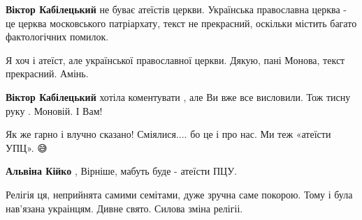 \begin{itemize}
\begin{itemize}
\textbf{Віктор Кабілецький} не буває атеїстів церкви. Українська православна церква - це церква московського патріархату, текст не прекрасний, оскільки містить багато фактологічних помилок.
\end{itemize}

 
Я хоч і атеїст, але української православної церкви.
Дякую, пані Монова, текст прекрасний. Амінь.

\begin{itemize}
 
\textbf{Віктор Кабілецький} хотіла коментувати , але Ви вже все висловили. Тож тисну руку . Моновій. І Вам!

 
Як же гарно і влучно сказано! Сміялися.... бо це і про нас. Ми теж «атеїсти УПЦ». 😅

 
\textbf{Альвіна Кійко} , Вірніше, мабуть буде - атеїсти ПЦУ.
\end{itemize}

 

Релігія ця, неприйнята самими семітами, дуже зручна саме покорою. Тому і була
нав'язана украінцям. Дивне свято. Силова зміна релігіі.



\end{itemize}
